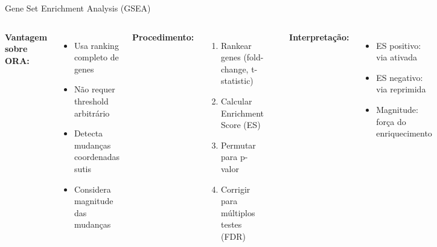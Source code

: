 \begin{frame}{Gene Set Enrichment Analysis (GSEA)}
\begin{columns}
\textbf{Vantagem sobre ORA:}
\begin{itemize}
    \item Usa ranking completo de genes
    \item Não requer threshold arbitrário
    \item Detecta mudanças coordenadas sutis
    \item Considera magnitude das mudanças
\end{itemize}

\vspace{0.3cm}

\textbf{Procedimento:}
\begin{enumerate}
    \item Rankear genes (fold-change, t-statistic)
    \item Calcular Enrichment Score (ES)
    \item Permutar para p-valor
    \item Corrigir para múltiplos testes (FDR)
\end{enumerate}

\begin{center}
\end{center}

\vspace{0.2cm}

\textbf{Interpretação:}
\begin{itemize}
    \item ES positivo: via ativada
    \item ES negativo: via reprimida
    \item Magnitude: força do enriquecimento
\end{itemize}
\end{columns}
\end{frame}


